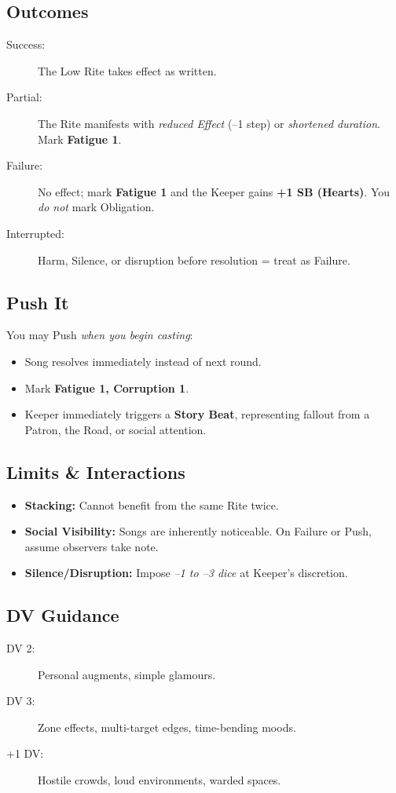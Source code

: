 \subsection*{Outcomes}
\begin{description}
\item[Success:] The Low Rite takes effect as written.
\item[Partial:] The Rite manifests with \emph{reduced Effect} (–1 step) or \emph{shortened duration}. Mark \textbf{Fatigue 1}.
\item[Failure:] No effect; mark \textbf{Fatigue 1} and the Keeper gains \textbf{+1 SB (Hearts)}. You \emph{do not} mark Obligation.
\item[Interrupted:] Harm, Silence, or disruption before resolution = treat as Failure.
\end{description}

\subsection*{Push It}
You may Push \emph{when you begin casting}:
\begin{itemize}
\item Song resolves immediately instead of next round.
\item Mark \textbf{Fatigue 1, Corruption 1}.
\item Keeper immediately triggers a \textbf{Story Beat}, representing fallout from a Patron, the Road, or social attention.
\end{itemize}

\subsection*{Limits \& Interactions}
\begin{itemize}
\item \textbf{Stacking:} Cannot benefit from the same Rite twice.
\item \textbf{Social Visibility:} Songs are inherently noticeable. On Failure or Push, assume observers take note.
\item \textbf{Silence/Disruption:} Impose \emph{–1 to –3 dice} at Keeper’s discretion.
\end{itemize}

\subsection*{DV Guidance}
\label{talent:cantors-path-dv}
\begin{description}
\item[DV 2:] Personal augments, simple glamours.
\item[DV 3:] Zone effects, multi-target edges, time-bending moods.
\item[+1 DV:] Hostile crowds, loud environments, warded spaces.
\end{description}

